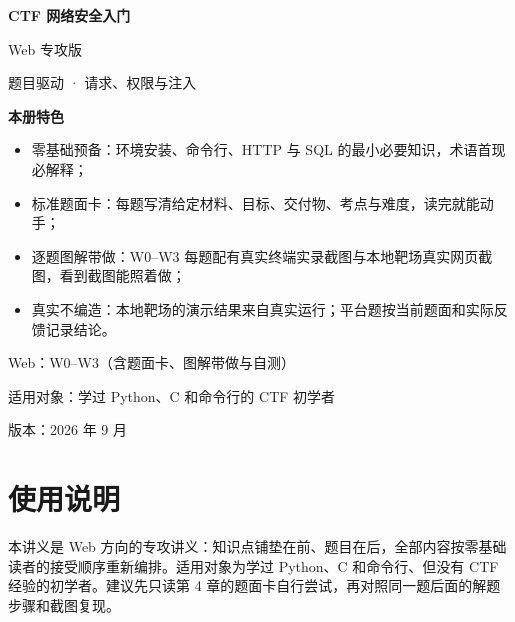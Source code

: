 \documentclass[UTF8,12pt,oneside]{ctexbook}
\begin{document}
\frontmatter
\begin{titlepage}
\centering
\vspace*{28mm}
{\Huge\bfseries CTF 网络安全入门\par}
\vspace{9mm}
{\LARGE Web 专攻版\par}
\vspace{5mm}
{\large 题目驱动 · 请求、权限与注入\par}
\vspace{14mm}
\begin{minipage}{0.86\linewidth}\small
\textbf{本册特色}\par\smallskip
\begin{itemize}
\item 零基础预备：环境安装、命令行、HTTP 与 SQL 的最小必要知识，术语首现必解释；
\item 标准题面卡：每题写清给定材料、目标、交付物、考点与难度，读完就能动手；
\item 逐题图解带做：W0--W3 每题配有真实终端实录截图与本地靶场真实网页截图，看到截图能照着做；
\item 真实不编造：本地靶场的演示结果来自真实运行；平台题按当前题面和实际反馈记录结论。
\end{itemize}
\end{minipage}
\vspace{12mm}
{\large Web：W0--W3（含题面卡、图解带做与自测）\par}
\vfill
{\large 适用对象：学过 Python、C 和命令行的 CTF 初学者\par}
\vspace{4mm}
{\large 版本：2026 年 9 月\par}
\end{titlepage}

\chapter*{使用说明}
本讲义是 Web 方向的专攻讲义：知识点铺垫在前、题目在后，全部内容按零基础读者的接受顺序重新编排。适用对象为学过 Python、C 和命令行、但没有 CTF 经验的初学者。建议先只读第 4 章的题面卡自行尝试，再对照同一题后面的解题步骤和截图复现。
\end{document}
